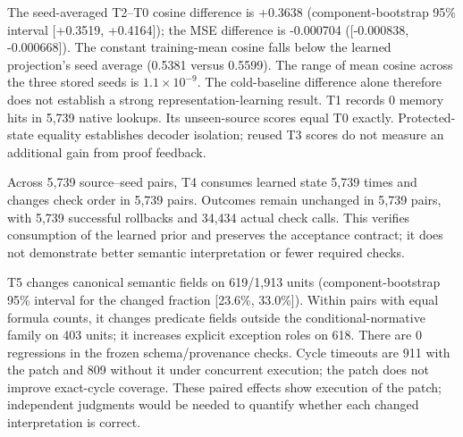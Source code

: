 The seed-averaged T2--T0 cosine difference is +0.3638 (component-bootstrap 95\% interval [+0.3519, +0.4164]); the MSE difference is -0.000704 ([-0.000838, -0.000668]). The constant training-mean cosine falls below the learned projection's seed average (0.5381 versus 0.5599). The range of mean cosine across the three stored seeds is $1.1\times 10^{-9}$. The cold-baseline difference alone therefore does not establish a strong representation-learning result. T1 records 0 memory hits in 5,739 native lookups. Its unseen-source scores equal T0 exactly. Protected-state equality establishes decoder isolation; reused T3 scores do not measure an additional gain from proof feedback.

Across 5,739 source--seed pairs, T4 consumes learned state 5,739 times and changes check order in 5,739 pairs. Outcomes remain unchanged in 5,739 pairs, with 5,739 successful rollbacks and 34,434 actual check calls. This verifies consumption of the learned prior and preserves the acceptance contract; it does not demonstrate better semantic interpretation or fewer required checks.

T5 changes canonical semantic fields on 619/1,913 units (component-bootstrap 95\% interval for the changed fraction [23.6\%, 33.0\%]). Within pairs with equal formula counts, it changes predicate fields outside the conditional-normative family on 403 units; it increases explicit exception roles on 618. There are 0 regressions in the frozen schema/provenance checks. Cycle timeouts are 911 with the patch and 809 without it under concurrent execution; the patch does not improve exact-cycle coverage. These paired effects show execution of the patch; independent judgments would be needed to quantify whether each changed interpretation is correct.

